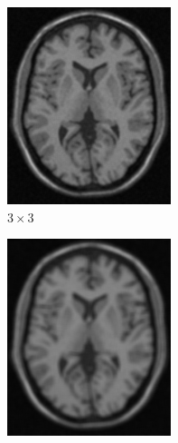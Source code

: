 \documentclass[letterpaper,12pt]{article}
\theoremstyle{plain}
\begin{document}
\begin{figure}[h]
\begin{subfigure}[h]{0.24\linewidth}
            \includegraphics[width=\textwidth]{Figuras/ImagenA3x3.png}
            \caption{\centering $3\times3$} 
         \end{subfigure}
         \begin{subfigure}[h]{0.24\linewidth}
            \centering
            \includegraphics[width=\textwidth]{Figuras/ImagenA5x5.png}

\end{subfigure}
\end{figure}
\end{document}

